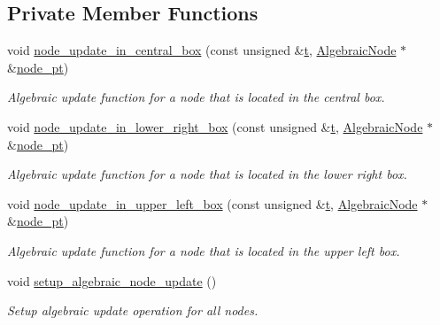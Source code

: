 \subsection*{Private Member Functions}
\begin{DoxyCompactItemize}
\item 
void \hyperlink{classoomph_1_1AlgebraicRefineableQuarterCircleSectorMesh_a89dc4a592e3f188f9bfbffd5c7fdbbcc}{node\+\_\+update\+\_\+in\+\_\+central\+\_\+box} (const unsigned \&\hyperlink{cfortran_8h_af6f0bd3dc13317f895c91323c25c2b8f}{t}, \hyperlink{classoomph_1_1AlgebraicNode}{Algebraic\+Node} $\ast$\&\hyperlink{classoomph_1_1AlgebraicMesh_aedeebbe95d2f8e67e9939cecd1be3933}{node\+\_\+pt})
\begin{DoxyCompactList}\small\item\em Algebraic update function for a node that is located in the central box. \end{DoxyCompactList}\item 
void \hyperlink{classoomph_1_1AlgebraicRefineableQuarterCircleSectorMesh_a9a7d3e4a2126346cdae3bde51eff7b36}{node\+\_\+update\+\_\+in\+\_\+lower\+\_\+right\+\_\+box} (const unsigned \&\hyperlink{cfortran_8h_af6f0bd3dc13317f895c91323c25c2b8f}{t}, \hyperlink{classoomph_1_1AlgebraicNode}{Algebraic\+Node} $\ast$\&\hyperlink{classoomph_1_1AlgebraicMesh_aedeebbe95d2f8e67e9939cecd1be3933}{node\+\_\+pt})
\begin{DoxyCompactList}\small\item\em Algebraic update function for a node that is located in the lower right box. \end{DoxyCompactList}\item 
void \hyperlink{classoomph_1_1AlgebraicRefineableQuarterCircleSectorMesh_aeb36f6747d14cd68d4857169fa0f22d1}{node\+\_\+update\+\_\+in\+\_\+upper\+\_\+left\+\_\+box} (const unsigned \&\hyperlink{cfortran_8h_af6f0bd3dc13317f895c91323c25c2b8f}{t}, \hyperlink{classoomph_1_1AlgebraicNode}{Algebraic\+Node} $\ast$\&\hyperlink{classoomph_1_1AlgebraicMesh_aedeebbe95d2f8e67e9939cecd1be3933}{node\+\_\+pt})
\begin{DoxyCompactList}\small\item\em Algebraic update function for a node that is located in the upper left box. \end{DoxyCompactList}\item 
void \hyperlink{classoomph_1_1AlgebraicRefineableQuarterCircleSectorMesh_a3eb269dc5c26355a808d1c5035190017}{setup\+\_\+algebraic\+\_\+node\+\_\+update} ()
\begin{DoxyCompactList}\small\item\em Setup algebraic update operation for all nodes. \end{DoxyCompactList}\item 

\end{DoxyCompactItemize}
